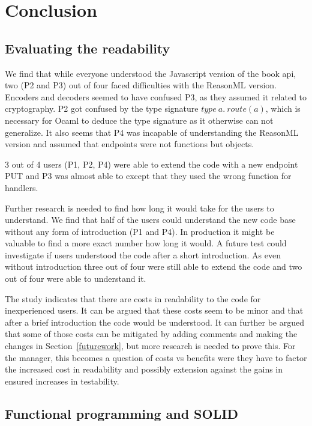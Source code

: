 \chapter{Conclusion}\label{conclusion}

\section{Evaluating the readability}

We find that while everyone understood the Javascript version of the book api,
two (P2 and P3) out of four faced difficulties with the ReasonML version.
Encoders and decoders seemed to have confused P3, as they assumed it related to
cryptography. P2 got confused by the type signature $type\ a.\ route(a)$, which
is necessary for Ocaml to deduce the type signature as it otherwise can not
generalize.  It also seems that P4 was incapable of understanding the ReasonML
version and assumed that endpoints were not functions but objects.

3 out of 4 users (P1, P2, P4) were able to extend the code with a new endpoint
PUT and P3 was almost able to except that they used the wrong function for
handlers.

Further research is needed to find how long it would take for the users to
understand.  We find that half of the users could understand the new code base
without any form of introduction (P1 and P4). In production it might be
valuable to find a more exact number how long it would. A future test could
investigate if users understood the code after a short introduction. As even
without introduction three out of four were still able to extend the code and
two out of four were able to understand it.

The study indicates that there are costs in readability to the code for
inexperienced users. It can be argued that these costs seem to be minor and that
after a brief introduction the code would be understood. It can further be
argued that some of those costs can be mitigated by adding comments and making
the changes in Section~\ref{futurework}, but more research is needed to prove
this. For the manager, this becomes a question of costs vs benefits were they
have to factor the increased cost in readability and possibly extension against
the gains in ensured increases in testability.

\section{Functional programming and SOLID}

